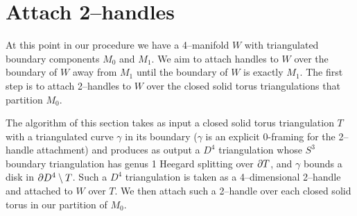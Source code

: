 \section{Attach 2--handles}

At this point in our procedure we have a 4--manifold $W$ with triangulated boundary components $M_0$ and $M_1$.
We aim to attach handles to $W$ over the boundary of $W$ away from $M_1$ until the boundary of $W$ is exactly $M_1$.
The first step is to attach 2--handles to $W$ over the closed solid torus triangulations that partition $M_0$.

The algorithm of this section takes as input a closed solid torus triangulation $T$ with a triangulated curve $\gamma$ in its boundary ($\gamma$ is an explicit 0-framing for the 2--handle attachment) and produces as output a $D^4$ triangulation whose $S^3$ boundary triangulation has genus 1 Heegard splitting over $\partial T$, and $\gamma$ bounds a disk in $\partial D^4\setminus T$.
Such a $D^4$ triangulation is taken as a 4--dimensional 2--handle and attached to $W$ over $T$.
We then attach such a 2--handle over each closed solid torus in our partition of $M_0$.